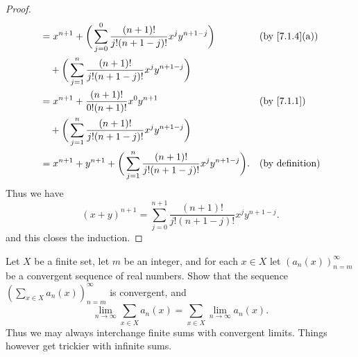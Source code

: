 \begin{proof}
\begin{align*}
     & = x^{n + 1} + \bigg(\sum_{j = 0}^0 \dfrac{(n + 1)!}{j!(n + 1 - j)!} x^j y^{n + 1 - j}\bigg)                                   &  & \text{(by \cref{7.1.4}(a))} \\
     & \quad + \bigg(\sum_{j = 1}^n \dfrac{(n + 1)!}{j!(n + 1 - j)!} x^j y^{n + 1 - j}\bigg)                                                                          \\
     & = x^{n + 1} + \dfrac{(n + 1)!}{0! (n + 1)!} x^0 y^{n + 1}                                                                     &  & \by{7.1.1}                  \\
     & \quad + \bigg(\sum_{j = 1}^n \dfrac{(n + 1)!}{j!(n + 1 - j)!} x^j y^{n + 1 - j}\bigg)                                                                          \\
     & = x^{n + 1} + y^{n + 1} + \bigg(\sum_{j = 1}^n \dfrac{(n + 1)!}{j!(n + 1 - j)!} x^j y^{n + 1 - j}\bigg).                      &  & \text{(by definition)}
  \end{align*}
  Thus we have
  \[
    (x + y)^{n + 1} = \sum_{j = 0}^{n + 1} \dfrac{(n + 1)!}{j!(n + 1 - j)!} x^j y^{n + 1 - j}.
  \]
  and this closes the induction.
\end{proof}

\begin{ex}\label{ex:7.1.5}
  Let \(X\) be a finite set, let \(m\) be an integer, and for each \(x \in X\) let \((a_n(x))_{n = m}^\infty\) be a convergent sequence of real numbers.
  Show that the sequence \((\sum_{x \in X} a_n(x))_{n = m}^\infty\) is convergent, and
  \[
    \lim_{n \to \infty} \sum_{x \in X} a_n(x) = \sum_{x \in X} \lim_{n \to \infty} a_n(x).
  \]
  Thus we may always interchange finite sums with convergent limits.
  Things however get trickier with infinite sums.
\end{ex}

